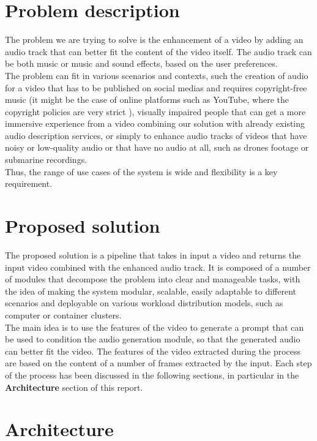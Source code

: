 \documentclass[conference]{IEEEtran}
\begin{document}
\section{Problem description}
The problem we are trying to solve is the enhancement of a video by adding an audio track that can better fit the content of the video itself. The audio track can be both music or music and sound effects, based on the user preferences. \\
The problem can fit in various scenarios and contexts, such the creation of audio for a video that has to be published on social medias and requires copyright-free music (it might be the case of online platforms such as YouTube, where the copyright policies are very strict \cite{ytcopyright}), visually impaired people that can get a more immersive experience from a video combining our solution with already existing audio description services, or simply to enhance audio tracks of videos that have noisy or low-quality audio or that have no audio at all, such as drones footage or submarine recordings. \\
Thus, the range of use cases of the system is wide and flexibility is a key requirement. 

\section{Proposed solution}
The proposed solution is a pipeline that takes in input a video and returns the input video combined with the enhanced audio track. It is composed of a number of modules that decompose the problem into clear and manageable tasks, with the idea of making the system modular, scalable, easily adaptable to different scenarios and deployable on various workload distribution models, such as computer or container clusters. \\
The main idea is to use the features of the video to generate a prompt that can be used to condition the audio generation module, so that the generated audio can better fit the video. The features of the video extracted during the process are based on the content of a number of frames extracted by the input. Each step of the process has been discussed in the following sections, in particular in the \textbf{Architecture} section of this report.

\section{Architecture}
\end{document}
